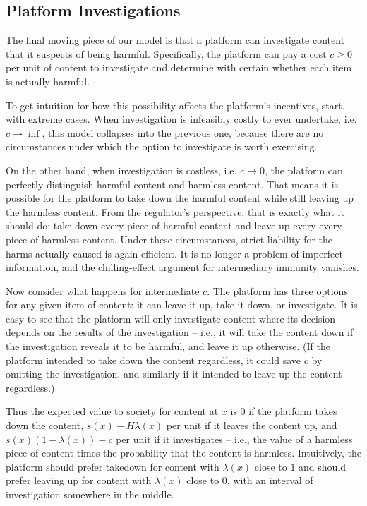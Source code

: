 \subsection{Platform Investigations}

The final moving piece of our model is that a platform can investigate content that it suspects of being harmful. Specifically, the platform can pay a cost $c \ge 0$  per unit of content to investigate and determine with certain whether each item is actually harmful.

To get intuition for how this possibility affects the platform's incentives, start. with extreme cases. When investigation is infeasibly costly to ever undertake, i.e. $c \to \inf$, this model collapses into the previous one, because there are no circumstances under which the option to investigate is worth exercising.

On the other hand, when investigation is costless, i.e. $c \to 0$, the platform can  perfectly distinguish harmful content and harmless content. That means it is possible for the platform to take down the harmful content while still leaving up the harmless content. From the regulator's perspective, that is exactly what it should do: take down every piece of harmful content and leave up every every piece of harmless content. Under these circumstances, strict liability for the harms actually caused is again efficient. It is no longer a problem of imperfect information, and the chilling-effect argument for intermediary immunity vanishes.

Now consider what happens for intermediate $c$. The platform has three options for any given item of content: it can leave it up, take it down, or investigate. It is easy to see that the platform will only investigate content where its decision depends on the results of the investigation -- i.e.,  it will take the content down if the investigation reveals it to be harmful, and leave it up otherwise. (If the platform intended to take down the content regardless, it could save $c$ by omitting the investigation, and similarly if it intended to leave up the content regardless.)

Thus the expected value to society for content at $x$ is $0$ if the platform takes down the content, $s(x) - H\lambda(x)$ per unit if it leaves the content up, and $s(x)(1 - \lambda(x)) - c$ per unit if it investigates -- i.e., the value of a harmless piece of content times the probability that the content is harmless. Intuitively, the platform should prefer takedown for content with $\lambda(x)$ close to $1$ and should prefer leaving up for content with $\lambda(x)$ close to $0$, with an interval of investigation somewhere in the middle. 

